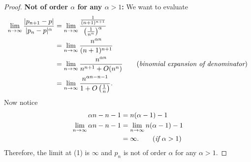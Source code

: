 \documentclass{article}
\begin{document}
\begin{description}
\begin{proof}
        \textbf{Not of order $\alpha$ for any $\alpha>1$:} 
        We want to evaluate
        \begin{align}
            \lim_{n\rightarrow\infty}\frac{|p_{n+1}-p|}{|p_n-p|^\alpha} & =
            \lim_{n\rightarrow\infty}\frac{\frac{1}{(n+1)^{n+1}}}{\left(\frac{1}{n^n}\right)^\alpha} \nonumber \\
            & = \lim_{n\rightarrow\infty}\frac{n^{\alpha n}}{(n+1)^{n+1}} \nonumber \\
            & = \lim_{n\rightarrow\infty}\frac{n^{\alpha n}}{n^{n+1}+O(n^{n})} \qquad 
            (\emph{binomial expansion of denominator}) \nonumber \\
            & = \lim_{n\rightarrow\infty}\frac{n^{\alpha n -n-1}}{1+O\left(\frac{1}{n}\right)}.
        \end{align}
        Now notice 
        \begin{align*}
            \alpha n - n - 1 & = n(\alpha-1)-1 \\
            \lim_{n\rightarrow\infty}\alpha n - n - 1 & = \lim_{n\rightarrow\infty}n(\alpha-1)-1 \\
            & = \infty. \qquad (\emph{if $\alpha>1$})
        \end{align*}
        Therefore, the limit at (1) is $\infty$ and $p_n$ is not of order $\alpha$ for any 
        $\alpha>1$.
    \end{proof}
\end{description}
\end{document}
